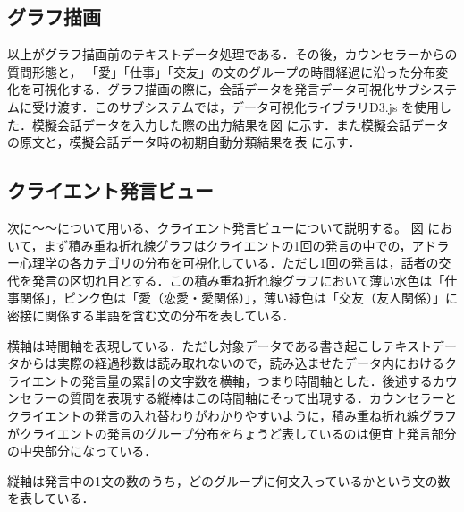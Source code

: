 \documentclass[shuuron]{kuee}
\begin{document}
\subsection{グラフ描画}
以上がグラフ描画前のテキストデータ処理である．その後，カウンセラーからの質問形態と， 「愛」「仕事」「交友」の文のグループの時間経過に沿った分布変化を可視化する．グラフ描画の際に，会話データを発言データ可視化サブシステムに受け渡す．このサブシステムでは，データ可視化ライブラリD3.js
を使用した．模擬会話データを入力した際の出力結果を図
に示す．また模擬会話データの原文と，模擬会話データ時の初期自動分類結果を表
に示す．
%

\subsection{クライエント発言ビュー}
次に〜〜について用いる、クライエント発言ビューについて説明する。
図
において，まず積み重ね折れ線グラフはクライエントの1回の発言の中での，アドラー心理学の各カテゴリの分布を可視化している．ただし1回の発言は，話者の交代を発言の区切れ目とする．この積み重ね折れ線グラフにおいて薄い水色は「仕事関係」，ピンク色は「愛（恋愛・愛関係）」，薄い緑色は「交友（友人関係）」に密接に関係する単語を含む文の分布を表している．

横軸は時間軸を表現している．ただし対象データである書き起こしテキストデータからは実際の経過秒数は読み取れないので，読み込ませたデータ内におけるクライエントの発言量の累計の文字数を横軸，つまり時間軸とした．後述するカウンセラーの質問を表現する縦棒はこの時間軸にそって出現する．カウンセラーとクライエントの発言の入れ替わりがわかりやすいように，積み重ね折れ線グラフがクライエントの発言のグループ分布をちょうど表しているのは便宜上発言部分の中央部分になっている．

縦軸は発言中の1文の数のうち，どのグループに何文入っているかという文の数を表している．
\end{document}
